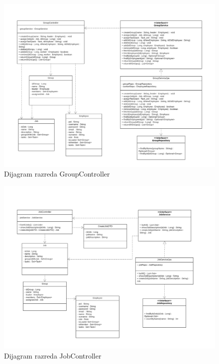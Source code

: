 			
			\eject
			\begin{figure}[H]
					\centering
					\includegraphics[width=\textwidth]{slike/UML class - GroupController.png}
					\caption{Dijagram razreda GroupController}
				\end{figure}
			
			
			\eject
			\begin{figure}[H]
					\centering
					\includegraphics[width=\textwidth]{slike/UML class - JobController.png}
					\caption{Dijagram razreda JobController}
				\end{figure}
			
